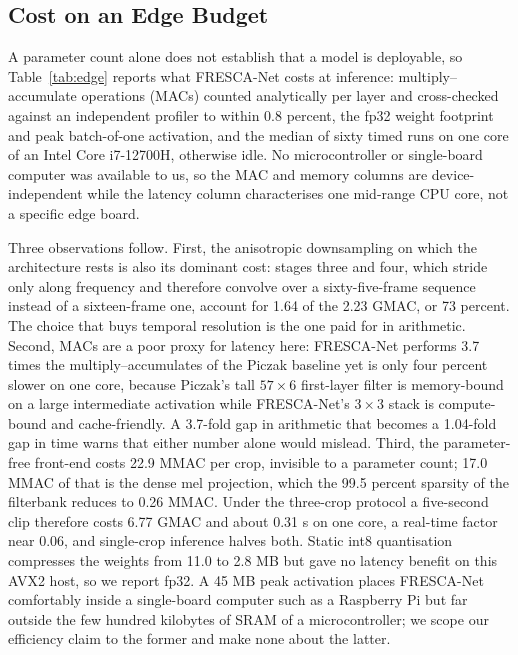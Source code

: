 \documentclass[conference]{IEEEtran}
\begin{document}
\subsection{Cost on an Edge Budget}
A parameter count alone does not establish that a model is deployable, so Table~\ref{tab:edge} reports what FRESCA-Net costs at inference: multiply--accumulate operations (MACs) counted analytically per layer and cross-checked against an independent profiler to within 0.8 percent, the fp32 weight footprint and peak batch-of-one activation, and the median of sixty timed runs on one core of an Intel Core i7-12700H, otherwise idle. No microcontroller or single-board computer was available to us, so the MAC and memory columns are device-independent while the latency column characterises one mid-range CPU core, not a specific edge board.

Three observations follow. First, the anisotropic downsampling on which the architecture rests is also its dominant cost: stages three and four, which stride only along frequency and therefore convolve over a sixty-five-frame sequence instead of a sixteen-frame one, account for 1.64 of the 2.23 GMAC, or 73 percent. The choice that buys temporal resolution is the one paid for in arithmetic. Second, MACs are a poor proxy for latency here: FRESCA-Net performs 3.7 times the multiply--accumulates of the Piczak baseline yet is only four percent slower on one core, because Piczak's tall $57\times6$ first-layer filter is memory-bound on a large intermediate activation while FRESCA-Net's $3\times3$ stack is compute-bound and cache-friendly. A 3.7-fold gap in arithmetic that becomes a 1.04-fold gap in time warns that either number alone would mislead. Third, the parameter-free front-end costs 22.9 MMAC per crop, invisible to a parameter count; 17.0 MMAC of that is the dense mel projection, which the 99.5 percent sparsity of the filterbank reduces to 0.26 MMAC. Under the three-crop protocol a five-second clip therefore costs 6.77 GMAC and about 0.31 s on one core, a real-time factor near 0.06, and single-crop inference halves both. Static int8 quantisation compresses the weights from 11.0 to 2.8 MB but gave no latency benefit on this AVX2 host, so we report fp32. A 45 MB peak activation places FRESCA-Net comfortably inside a single-board computer such as a Raspberry Pi but far outside the few hundred kilobytes of SRAM of a microcontroller; we scope our efficiency claim to the former and make none about the latter.
\end{document}
